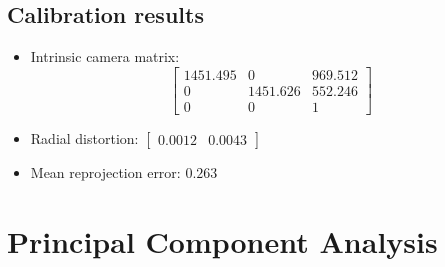 \documentclass[paper=a4, fontsize=11pt]{scrartcl} %
\begin{document}
    \subsection{Calibration results}
    \begin{itemize}
        \item Intrinsic camera matrix:
        \[ \left[ \begin{matrix}
        1451.495    & 0           & 969.512    \\
        0           & 1451.626    & 552.246    \\
        0           & 0           & 1
        \end{matrix} \right] \]

        \item Radial distortion: $\left[ \begin{matrix} 0.0012 & 0.0043 \end{matrix} \right]$

        \item Mean reprojection error: $0.263$
    \end{itemize}

    \newpage
    \section{Principal Component Analysis}
\end{document}
